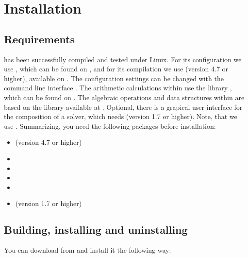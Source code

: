 \chapter{Installation}
\label{chapter:installation}
\section{Requirements}
\smtrat has been successfully compiled and tested under Linux. For its configuration we use \cmake, which can be found on \cmakeURL, and for its compilation we use \gplusplus (version 4.7 or higher), available on \gplusplusURL. The configuration settings can be changed with the command line interface \ccmake. The arithmetic calculations within \smtrat use the \Cpp library \Ginac, which can be found on \ginacURL. The algebraic operations and data structures within \smtrat are based on the \Cpp library \ginacra available at \ginacraURL. Optional, there is a grapical user interface for the composition of a solver, which needs \java (version 1.7 or higher). Note, that we use \Cppeleven. Summarizing, you need the following packages before installation:
\begin{itemize}
	\item \gplusplus (version 4.7 or higher)
	\item \cmake
	\item \ccmake
	\item \Ginac
	\item \ginacra
	\item \java (version 1.7 or higher)
\end{itemize}

\section{Building, installing and uninstalling \smtrat}
You can download \smtrat from \smtratURL and install it the following way:

